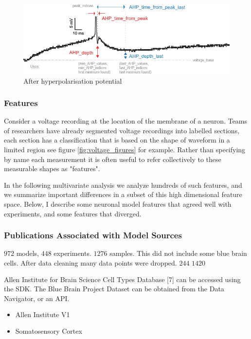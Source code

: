 \begin{figure}
    \centering
    \includegraphics{figures/AHP.png}
    \caption{After hyperpolarisation potential }
    \label{fig:features_example_ahp}
\end{figure}



\subsubsection{Features} 
Consider a voltage recording at the location of the membrane of a neuron. Teams of researchers have already segmented voltage recordings into labelled sections, each section has a classification that is based on the shape of waveform in a limited region see figure \ref{fig:voltage_figures} for example. Rather than specifying by name each measurement it is often useful to refer collectively to these measurable shapes as "features". 

In the following multivariate analysis we analyze hundreds of such features, and we summarize important differences in a subset of this high dimensional feature space.  Below, I describe some neuronal model features that agreed well with experiments, and some features that diverged.


\subsubsection{Publications Associated with Model Sources}
$972$ models, $448$ experiments.
$1276$ samples. This did not include some blue brain cells. After data cleaning many data points were dropped.  $244$
$1420$


Allen Institute for Brain Science Cell Types Database [7] can be accessed using the SDK.  The Blue Brain Project Dataset can be obtained from the Data Navigator, or an API.

\begin{itemize}
\item Allen Institute V1 \cite{gouwens2018systematic}
\item Somatosensory Cortex \cite{markram2015} 
\end{itemize}

